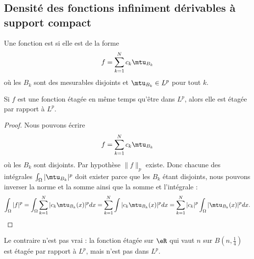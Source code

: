 \subsection{Densité des fonctions infiniment dérivables à support compact}

\begin{definition}
	Une fonction est  si elle est de la forme
	\begin{equation}
		f=\sum_{k=1}^Nc_k\mtu_{B_k}
	\end{equation}
	où les \( B_k\) sont des mesurables disjoints et \( \mtu_{B_k}\in L^p\) pour tout \( k\).
\end{definition}

\begin{lemma}   \label{LemWHIRdaX}
	Si \( f\) est une fonction étagée en même temps qu'être dans \( L^p\), alors elle est étagée par rapport à \( L^p\).
\end{lemma}

\begin{proof}
	Nous pouvons écrire
	\begin{equation}
		f=\sum_{k=1}^Nc_k\mtu_{B_k}
	\end{equation}
	où les \( B_k\) sont disjoints. Par hypothèse \( \| f \|_p\) existe. Donc chacune des intégrales \( \int_{\Omega}| \mtu_{B_k} |^p\) doit exister parce que les \( B_k\) étant disjoints, nous pouvons inverser la norme et la somme ainsi que la somme et l'intégrale :
	\begin{equation}
		\int_{\Omega}|f|^p=\int_{\Omega}\sum_{k=1}^N| c_k\mtu_{B_k}(x) |^pdx=\sum_{k=1}^N\int| c_k\mtu_{B_k}(x) |^pdx=\sum_{k=1}^N| c_k |^p\int_{\Omega}| \mtu_{B_k}(x) |^pdx.
	\end{equation}
\end{proof}
Le contraire n'est pas vrai : la fonction étagée sur \( \eR\) qui vaut \( n\) sur \( B(n,\frac{1}{ 4 })\) est étagée par rapport à \( L^p\), mais n'est pas dans \( L^p\).

